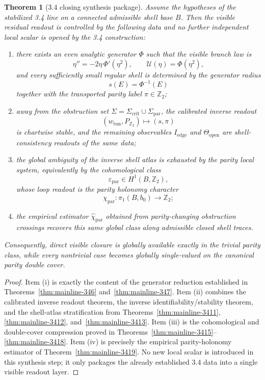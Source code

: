 \documentclass[12pt,a4paper]{article}
\newtheorem{theorem}{Theorem}[section]
\begin{document}
\begin{theorem}[3.4 closing synthesis package]
\label{thm:mainline-3420}
Assume the hypotheses of the stabilized 3.4 line on a connected admissible shell base $B$. Then the visible residual readout is controlled by the following data and no further independent local scalar is opened by the 3.4 construction:
\begin{enumerate}[label=(\roman*), leftmargin=2em]
 \item there exists an even analytic generator $\Phi$ such that the visible branch law is
 \[
 \eta'' = -2\eta\,\Phi'(\eta^2),
 \qquad
 \mathcal U(\eta)=\Phi(\eta^2),
 \]
 and every sufficiently small regular shell is determined by the generator radius
 \[
 s(E)=\Phi^{-1}(E)
 \]
 together with the transported parity label $\pi\in\mathbb Z_2$;

 \item away from the obstruction set $\Sigma=\Sigma_{\mathrm{crit}}\cup\Sigma_{\mathrm{par}}$, the calibrated inverse readout
 \[
 (w_{\mathrm{tun}},P_{\mathbb Z_2})\longmapsto (s,\pi)
 \]
 is chartwise stable, and the remaining observables $I_{\mathrm{edge}}$ and $\Theta_{\mathrm{open}}$ are shell-consistency readouts of the same data;

 \item the global ambiguity of the inverse shell atlas is exhausted by the parity local system, equivalently by the cohomological class
 \[
 \varepsilon_{\mathrm{par}}\in H^1(B,\mathbb Z_2),
 \]
 whose loop readout is the parity holonomy character
 \[
 \chi_{\mathrm{par}}:\pi_1(B,b_0)\to\mathbb Z_2;
 \]

 \item the empirical estimator $\widehat\chi_{\mathrm{par}}$ obtained from parity-changing obstruction crossings recovers this same global class along admissible closed shell traces.
\end{enumerate}
Consequently, direct visible closure is globally available exactly in the trivial parity class, while every nontrivial case becomes globally single-valued on the canonical parity double cover.
\end{theorem}

\begin{proof}
Item (i) is exactly the content of the generator reduction established in Theorems~\ref{thm:mainline-346} and~\ref{thm:mainline-347}. Item (ii) combines the calibrated inverse readout theorem, the inverse identifiability/stability theorem, and the shell-atlas stratification from Theorems~\ref{thm:mainline-3411}, \ref{thm:mainline-3412}, and~\ref{thm:mainline-3413}. Item (iii) is the cohomological and double-cover compression proved in Theorems~\ref{thm:mainline-3415}--\ref{thm:mainline-3418}. Item (iv) is precisely the empirical parity-holonomy estimator of Theorem~\ref{thm:mainline-3419}. No new local scalar is introduced in this synthesis step; it only packages the already established 3.4 data into a single visible readout layer.
\end{proof}
\end{document}
